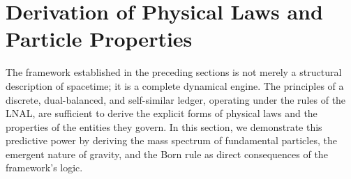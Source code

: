 \documentclass[11pt,a4paper]{article}
\begin{document}
\section{Derivation of Physical Laws and Particle Properties}

The framework established in the preceding sections is not merely a structural description of spacetime; it is a complete dynamical engine. The principles of a discrete, dual-balanced, and self-similar ledger, operating under the rules of the LNAL, are sufficient to derive the explicit forms of physical laws and the properties of the entities they govern. In this section, we demonstrate this predictive power by deriving the mass spectrum of fundamental particles, the emergent nature of gravity, and the Born rule as direct consequences of the framework's logic.
\end{document}
